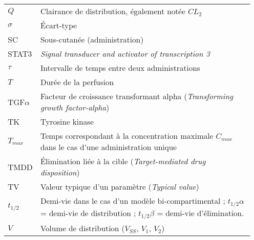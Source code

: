 \begin{tabularx}{30em}{X X}
$Q$ & 	Clairance de distribution, également notée $CL_2$\\
$\sigma$ & 	Écart-type\\
SC & 	Sous-cutanée (administration)\\
STAT3 & 	\textit{Signal transducer and activator of transcription 3}\\
$\tau$ & 	Intervalle de temps entre deux administrations\\
$T$ & 	Durée de la perfusion\\
TGF$\alpha$ & 	Facteur de croissance transformant alpha (\textit{Transforming growth factor-alpha})\\
TK & 	Tyrosine kinase \\
$T_{max}$ & 	Temps correspondant à la concentration maximale $C_{max}$ dans le cas d'une administration unique\\
TMDD & 	Élimination liée à la cible (\textit{Target-mediated drug disposition})\\
TV & 	Valeur typique d'un paramètre (\textit{Typical value})\\
$t_{1/2}$ & 	Demi-vie dans le cas d'un modèle bi-compartimental ; $t_{1/2}\alpha$ = demi-vie de distribution ; $t_{1/2}\beta$ = demi-vie d'élimination.\\
$V$ & 	Volume de distribution ($V_{SS}$, $V_1$, $V_2$)\\
\end{tabularx}

